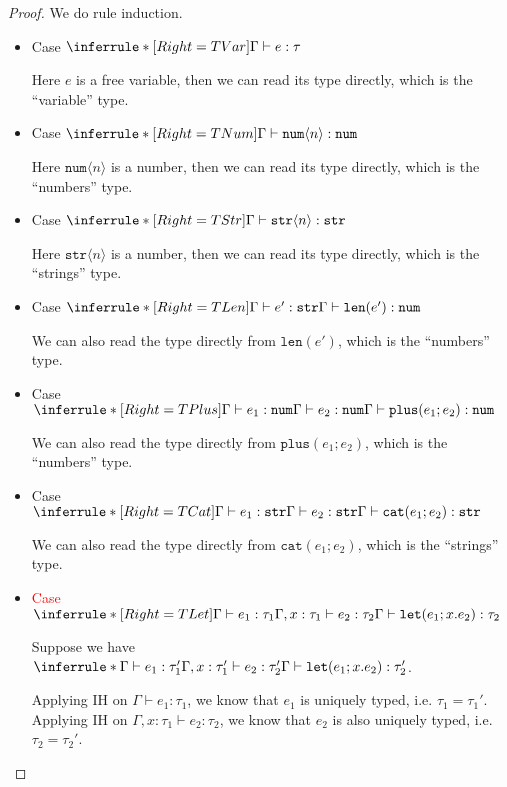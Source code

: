 \documentclass{article}
\theoremstyle{definition}
\newcommand{\ip}[1]{\langle #1 \rangle}
\begin{document}
\begin{proof}
    We do rule induction.
    \begin{itemize}
        \item Case $\inferrule*[Right=TVar]{ }{\Gamma \vdash e : \tau}$

              Here $e$ is a free variable, then we can read its type directly, which is the ``variable'' type.
        \item Case $\inferrule*[Right=TNum]{ }{\Gamma \vdash \mathtt{num}\ip{n} : \mathtt{num}}$

              Here $\mathtt{num}\ip{n}$ is a number, then we can read its type directly, which is the ``numbers'' type.
        \item Case $\inferrule*[Right=TStr]{ }{\Gamma \vdash \mathtt{str}\ip{n} : \mathtt{str}}$

              Here $\mathtt{str}\ip{n}$ is a number, then we can read its type directly, which is the ``strings'' type.
        \item Case $\inferrule*[Right=TLen]{\Gamma \vdash e':\mathtt{str}}{\Gamma \vdash \mathtt{len}(e') : \mathtt{num}}$

              We can also read the type directly from $\mathtt{len}(e')$, which is the ``numbers'' type.
        \item Case $\inferrule*[Right=TPlus]{\Gamma \vdash e_1:\mathtt{num}\\ \Gamma \vdash e_2:\mathtt{num}}{\Gamma \vdash \mathtt{plus}(e_1;e_2) : \mathtt{num}}$

              We can also read the type directly from $\mathtt{plus}(e_1;e_2)$, which is the ``numbers'' type.
        \item Case $\inferrule*[Right=TCat]{\Gamma \vdash e_1:\mathtt{str}\\ \Gamma \vdash e_2:\mathtt{str}}{\Gamma \vdash \mathtt{cat}(e_1;e_2) : \mathtt{str}}$

              We can also read the type directly from $\mathtt{cat}(e_1;e_2)$, which is the ``strings'' type.
        \item \textcolor{red}{Case} $\inferrule*[Right=TLet]{\Gamma \vdash e_1:\tau_1 \\ \Gamma,x:\tau_1 \vdash e_2:\tau_2}{\Gamma \vdash \mathtt{let}(e_1;x.e_2) : \tau_2}$

              Suppose we have $\inferrule*{\Gamma \vdash e_1:\tau_1' \\ \Gamma,x:\tau_1' \vdash e_2:\tau_2'}{\Gamma \vdash \mathtt{let}(e_1;x.e_2) : \tau_2'}$.

              Applying IH on $\Gamma \vdash e_1:\tau_1$, we know that $e_1$ is uniquely typed, i.e. $\tau_1 = \tau_1'$.
              Applying IH on $\Gamma,x:\tau_1 \vdash e_2:\tau_2$, we know that $e_2$ is also uniquely typed, i.e. $\tau_2 = \tau_2'$.
    \end{itemize}
\end{proof}
\end{document}
